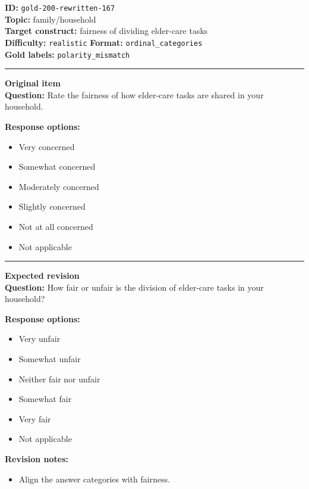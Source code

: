 \documentclass[10pt,a4paper]{article}
\newcommand{\sectionline}{\vspace{0.15em}\hrule\vspace{0.35em}}
\begin{document}
\begin{tcolorbox}[colframe=FlawRed,colback=white,colbacktitle=FlawRed!9,coltitle=black,title={Item 167\hfill Flawed item}]
\textbf{ID:} \texttt{gold-200-rewritten-167}\\
\textbf{Topic:} family/household\\
\textbf{Target construct:} fairness of dividing elder-care tasks\\
\textbf{Difficulty:} \texttt{realistic} \quad \textbf{Format:} \texttt{ordinal\_categories}\\
\textbf{Gold labels:} \texttt{polarity\_mismatch}\\
\sectionline
\textbf{Original item}\\
\textbf{Question:} Rate the fairness of how elder-care tasks are shared in your household.
\par\textbf{Response options:}
\begin{itemize}
\item Very concerned
\item Somewhat concerned
\item Moderately concerned
\item Slightly concerned
\item Not at all concerned
\item Not applicable
\end{itemize}
\sectionline
\textbf{Expected revision}\\
\textbf{Question:} How fair or unfair is the division of elder-care tasks in your household?
\par\textbf{Response options:}
\begin{itemize}
\item Very unfair
\item Somewhat unfair
\item Neither fair nor unfair
\item Somewhat fair
\item Very fair
\item Not applicable
\end{itemize}
\par\textbf{Revision notes:}
\begin{itemize}
\item Align the answer categories with fairness.
\end{itemize}
\end{tcolorbox}
\end{document}
